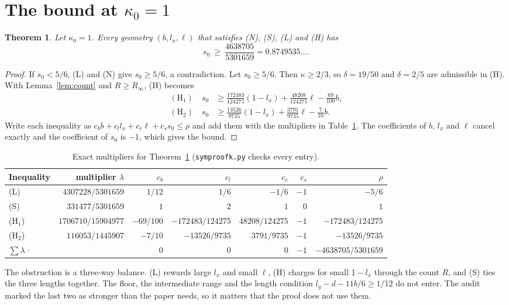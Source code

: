 \documentclass[11pt]{article}
\newtheorem{theorem}{Theorem}
\theoremstyle{remark}\newtheorem*{remark}{Remark}
\begin{document}
\section{The bound at $\kappa_0=1$}
\begin{theorem}\label{thm:main}
Let $\kappa_0=1$. Every geometry $(b,l_x,\ell)$ that satisfies (N), (S), (L) and (H) has
\[ s_0\ \ge\ \frac{4638705}{5301659}=0.8749535\ldots. \]
\end{theorem}
\begin{proof}
If $s_0<5/6$, (L) and (N) give $s_0\ge5/6$, a contradiction. Let $s_0\ge5/6$. Then
$\kappa\ge2/3$, so $\delta=19/50$ and $\delta=2/5$ are admissible in (H). With
Lemma~\ref{lem:count} and $R\ge R_\infty$, (H) becomes
\begin{align*}
(\mathrm H_1)\quad s_0&\ge \tfrac{172483}{124275}(1-l_x)+\tfrac{48208}{124275}\ell-\tfrac{69}{100}b,\\
(\mathrm H_2)\quad s_0&\ge \tfrac{13526}{9735}(1-l_x)+\tfrac{3791}{9735}\ell-\tfrac{7}{10}b.
\end{align*}
Write each inequality as $c_b b+c_l l_x+c_e\ell+c_s s_0\le \rho$ and add them with the multipliers in
Table~\ref{tab:mult}. The coefficients of $b$, $l_x$ and $\ell$ cancel exactly and the coefficient of $s_0$
is $-1$, which gives the bound.
\end{proof}
\begin{table}[h]\centering\small\setlength{\tabcolsep}{3.5pt}
\begin{tabular}{lrrrrrr}\toprule
Inequality & multiplier $\lambda$ & $c_b$ & $c_l$ & $c_e$ & $c_s$ & $\rho$\\\midrule
(L) & $4307228/5301659$ & $1/12$ & $1/6$ & $-1/6$ & $-1$ & $-5/6$\\
(S) & $331477/5301659$ & $1$ & $2$ & $1$ & $0$ & $1$\\
(H$_1$) & $1706710/15904977$ & $-69/100$ & $-172483/124275$ & $48208/124275$ & $-1$ & $-172483/124275$\\
(H$_2$) & $116053/1445907$ & $-7/10$ & $-13526/9735$ & $3791/9735$ & $-1$ & $-13526/9735$\\\midrule
$\sum\lambda\,\cdot$ & & $0$ & $0$ & $0$ & $-1$ & $-4638705/5301659$\\\bottomrule
\end{tabular}
\caption{Exact multipliers for Theorem~\ref{thm:main} (\texttt{symproofk.py} checks every entry).}
\label{tab:mult}
\end{table}

The obstruction is a three-way balance. (L) rewards large $l_x$ and small $\ell$, (H) charges for
small $1-l_x$ through the count $R$, and (S) ties the three lengths together. The floor, the
intermediate range and the length condition $l_y-d-11b/6\ge1/12$ do not enter. The audit marked the
last two as stronger than the paper needs, so it matters that the proof does not use them.
\end{document}
